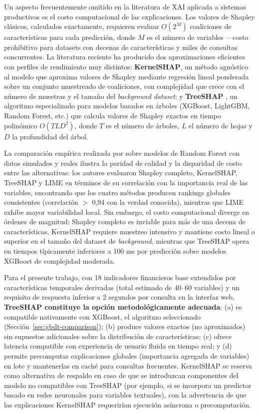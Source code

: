 \documentclass[12pt, letterpaper]{article}
\begin{document}
Un aspecto frecuentemente omitido en la literatura de XAI aplicada a sistemas productivos es el costo computacional de las explicaciones. Los valores de Shapley cl\'asicos, calculados exactamente, requieren evaluar $O(2^M)$ coaliciones de caracter\'isticas para cada predicci\'on, donde $M$ es el n\'umero de variables ---costo prohibitivo para datasets con decenas de caracter\'isticas y miles de consultas concurrentes. La literatura reciente ha producido dos aproximaciones eficientes con perfiles de rendimiento muy distintos: \textbf{KernelSHAP}, un m\'etodo agn\'ostico al modelo que aproxima valores de Shapley mediante regresi\'on lineal ponderada sobre un conjunto muestreado de coaliciones, con complejidad que crece con el n\'umero de muestras y el tama\~no del \textit{background dataset}; y \textbf{TreeSHAP} \citep{LundbergTreeSHAP2020}, un algoritmo especializado para modelos basados en \'arboles (XGBoost, LightGBM, Random Forest, etc.) que calcula valores de Shapley exactos en tiempo polin\'omico $O(TLD^2)$, donde $T$ es el n\'umero de \'arboles, $L$ el n\'umero de hojas y $D$ la profundidad del \'arbol.

La comparaci\'on emp\'irica realizada por \citet{Deng2024} sobre modelos de Random Forest con datos simulados y reales ilustra la paridad de calidad y la disparidad de costo entre las alternativas: los autores evaluaron Shapley completo, KernelSHAP, TreeSHAP y LIME en t\'erminos de su correlaci\'on con la importancia real de las variables, encontrando que los cuatro m\'etodos producen rankings globales consistentes (correlaci\'on $>$ 0,94 con la verdad conocida), mientras que LIME exhibe mayor variabilidad local. Sin embargo, el costo computacional diverge en \'ordenes de magnitud: Shapley completo es inviable para m\'as de una decena de caracter\'isticas, KernelSHAP requiere muestreo intensivo y mantiene costo lineal o superior en el tama\~no del dataset de \textit{background}, mientras que TreeSHAP opera en tiempos t\'ipicamente inferiores a 100 ms por predicci\'on sobre modelos XGBoost de complejidad moderada.

Para el presente trabajo, con 18 indicadores financieros base extendidos por caracter\'isticas temporales derivadas (total estimado de 40--60 variables) y un requisito de respuesta inferior a 2 segundos por consulta en la interfaz web, \textbf{TreeSHAP constituye la opci\'on metodol\'ogicamente adecuada}: (a) es compatible nativamente con XGBoost, el algoritmo seleccionado (Secci\'on~\ref{sec:gbdt-comparison}); (b) produce valores exactos (no aproximados) sin supuestos adicionales sobre la distribuci\'on de caracter\'isticas; (c) ofrece latencia compatible con experiencia de usuario fluida en tiempo real; y (d) permite precomputar explicaciones globales (importancia agregada de variables) en lote y mantenerlas en cach\'e para consultas frecuentes. KernelSHAP se reserva como alternativa de respaldo en caso de que se introduzcan componentes del modelo no compatibles con TreeSHAP (por ejemplo, si se incorpora un predictor basado en redes neuronales para variables textuales), con la advertencia de que las explicaciones KernelSHAP requerir\'ian ejecuci\'on as\'incrona o precomputaci\'on.
\end{document}

